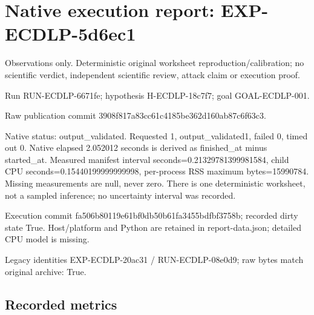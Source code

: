 \documentclass[10pt]{article}
\begin{document}
\section*{Native execution report: EXP-ECDLP-5d6ec1}
\noindent Observations only. Deterministic original worksheet reproduction/calibration; no scientific verdict, independent scientific review, attack claim or execution proof.\par\medskip
\noindent Run RUN-ECDLP-6671fe; hypothesis H-ECDLP-18c7f7; goal GOAL-ECDLP-001.\par
\noindent Raw publication commit 3908f817a83cc61c4185be362d160ab87c6f63c3.\par\medskip
Native status: output\_validated. Requested 1, output\_validated1, failed 0, timed out 0. Native elapsed 2.052012 seconds is derived as finished\_at minus started\_at. Measured manifest interval seconds=0.21329781399981584, child CPU seconds=0.15440199999999998, per-process RSS maximum bytes=15990784. Missing measurements are null, never zero. There is one deterministic worksheet, not a sampled inference; no uncertainty interval was recorded.\par\medskip
Execution commit fa506b80119e61bf0db50b61fa3455bdfbf3758b; recorded dirty state True. Host/platform and Python are retained in report-data.json; detailed CPU model is missing.\par\medskip
Legacy identities EXP-ECDLP-20ac31 / RUN-ECDLP-08e0d9; raw bytes match original archive: True.
\subsection*{Recorded metrics}

\end{document}
